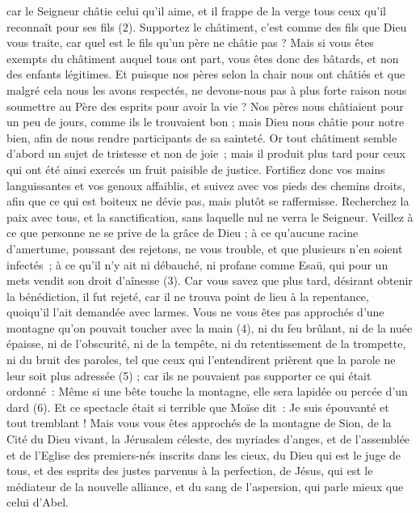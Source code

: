 \begin{multicols}{2}
car le Seigneur châtie celui qu'il aime, et il frappe de la verge tous ceux qu’il reconnaît pour ses fils (2).
Supportez le châtiment, c’est comme des fils que Dieu vous traite, car quel est le fils qu’un père ne châtie pas ?
Mais si vous êtes exempts du châtiment auquel tous ont part, vous êtes donc des bâtards, et non des enfants légitimes.
Et puisque nos pères selon la chair nous ont châtiés et que malgré cela nous les avons respectés, ne devons-nous pas à plus forte raison nous soumettre au Père des esprits pour avoir la vie ?
Nos pères nous châtiaient pour un peu de jours, comme ils le trouvaient bon ; mais Dieu nous châtie pour notre bien, afin de nous rendre participants de sa sainteté.
Or tout châtiment semble d’abord un sujet de tristesse et non de joie ; mais il produit plus tard pour ceux qui ont été ainsi exercés un fruit paisible de justice.
Fortifiez donc vos mains languissantes et vos genoux affaiblis,
et suivez avec vos pieds des chemins droits, afin que ce qui est boiteux ne dévie pas, mais plutôt se raffermisse.
Recherchez la paix avec tous, et la sanctification, sans laquelle nul ne verra le Seigneur.
Veillez à ce que personne ne se prive de la grâce de Dieu ; à ce qu’aucune racine d'amertume, poussant des rejetons, ne vous trouble, et que plusieurs n’en soient infectés ;
à ce qu’il n’y ait ni débauché, ni profane comme Esaü, qui pour un mets vendit son droit d’aînesse (3).
Car vous savez que plus tard, désirant obtenir la bénédiction, il fut rejeté, car il ne trouva point de lieu à la repentance, quoiqu'il l’ait demandée avec larmes.
Vous ne vous êtes pas approchés d’une montagne qu’on pouvait toucher avec la main (4), ni du feu brûlant, ni de la nuée épaisse, ni de l'obscurité, ni de la tempête,
ni du retentissement de la trompette, ni du bruit des paroles, tel que ceux qui l'entendirent prièrent que la parole ne leur soit plus adressée (5) ;
car ils ne pouvaient pas supporter ce qui était ordonné : Même si une bête touche la montagne, elle sera lapidée ou percée d'un dard (6).
Et ce spectacle était si terrible que Moïse dit : Je suis épouvanté et tout tremblant !
Mais vous vous êtes approchés de la montagne de Sion, de la Cité du Dieu vivant, la Jérusalem céleste, des myriades d'anges,
et de l'assemblée et de l'Eglise des premiers-nés inscrits dans les cieux, du Dieu qui est le juge de tous, et des esprits des justes parvenus à la perfection,
de Jésus, qui est le médiateur de la nouvelle alliance, et du sang de l'aspersion, qui parle mieux que celui d'Abel.

\end{multicols}
